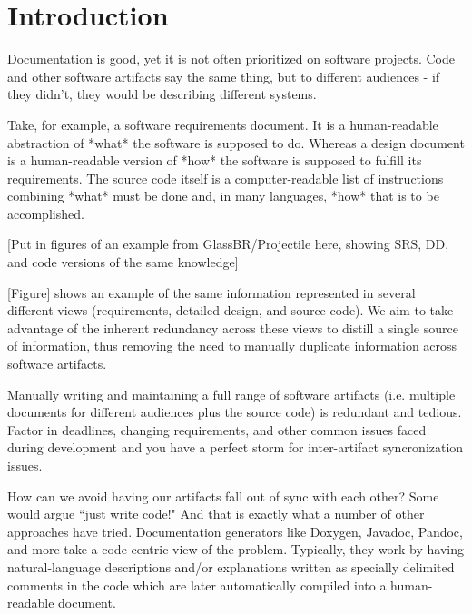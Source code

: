 \chapter{Introduction}


Documentation is good\citep{??}, yet it is not often prioritized on software
projects. Code and other software artifacts say the same thing, but to different
audiences - if they didn't, they would be describing different systems.

Take, for example, a software requirements document. It is a human-readable
abstraction of *what* the software is supposed to do. Whereas a design document
is a human-readable version of *how* the software is supposed to fulfill its
requirements. The source code itself is a computer-readable list of instructions
combining *what* must be done and, in many languages, *how* that is to be
accomplished.

[Put in figures of an example from GlassBR/Projectile here, showing SRS, DD, and
code versions of the same knowledge]

[Figure] shows an example of the same information represented in several
different views (requirements, detailed design, and source code). We aim to
take advantage of the inherent redundancy across these views to distill a single
source of information, thus removing the need to manually duplicate information
across software artifacts.

Manually writing and maintaining a full range of software artifacts (i.e.
multiple documents for different audiences plus the source code) is
redundant and tedious. Factor in deadlines, changing requirements, and other
common issues faced during development and you have a perfect storm for
inter-artifact syncronization issues.

How can we avoid having our artifacts fall out of sync with each other?
Some would argue ``just write code!" And that is exactly what a number of other
approaches have tried. Documentation generators like Doxygen, Javadoc, Pandoc,
and more take a code-centric view of the problem. Typically, they work by having
natural-language descriptions and/or explanations written as specially delimited
comments in the code which are later automatically compiled into a
human-readable document.

